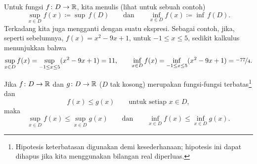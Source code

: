 \begin{myfigureht}
\caption{Contoh fungsi terbatas, suatu batas $M$, serta supremum dan infimumnya.\label{boundedfuncfig}}
\end{myfigureht}
Untuk fungsi $f \colon D \to {\mathbb{R}}$, kita menulis
(lihat  untuk
sebuah contoh)
\begin{equation*}
\sup_{x \in D} f(x) \coloneqq \sup\, f(D) \qquad \text{dan} \qquad
\inf_{x \in D} f(x) \coloneqq \inf\, f(D) .
\end{equation*}
Terkadang kita juga mengganti  dengan suatu ekspresi.
Sebagai contoh, jika, seperti sebelumnya, $f(x) = x^2-9x+1$, untuk $-1 \leq x \leq 5$,
sedikit kalkulus menunjukkan bahwa
\begin{equation*}
\sup_{x \in D} f(x) =
\sup_{-1 \leq x \leq 5} ( x^2 -9x+1 ) = 11,
\qquad
\inf_{x \in D} f(x) =
\inf_{-1 \leq x \leq 5} ( x^2 -9x+1 ) = \nicefrac{-77}{4} .
\end{equation*}



\begin{prop} \label{prop:funcsupinf}
Jika $f \colon D \to {\mathbb{R}}$ dan $g \colon D \to {\mathbb{R}}$ ($D$ tak kosong) merupakan
fungsi-fungsi terbatas\footnote{Hipotesis keterbatasan digunakan demi kesederhanaan;
hipotesis ini dapat dihapus jika kita menggunakan bilangan real diperluas.}
dan
\begin{equation*}
f(x) \leq g(x) \qquad \text{untuk setiap } x \in D,
\end{equation*}
maka
\begin{equation} \label{prop:funcsupinf:eq}
\sup_{x \in D} f(x) \leq \sup_{x \in D} g(x)
\qquad \text{dan} \qquad
\inf_{x \in D} f(x) \leq \inf_{x \in D} g(x) .
\end{equation}
\end{prop}


